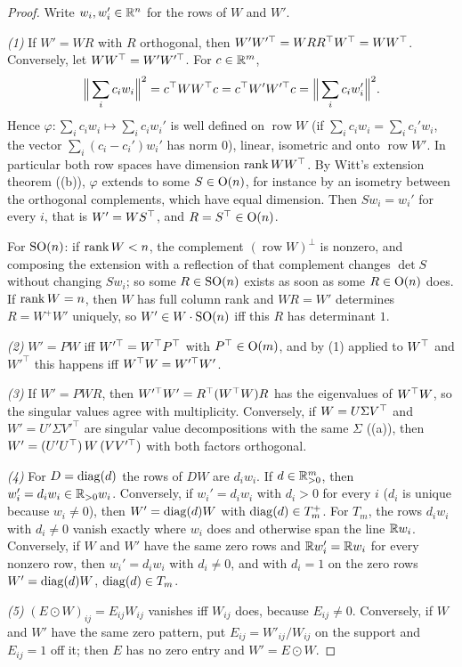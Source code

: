\begin{proof}
Write $w_i,w_i'\in\mathbb{R}^n$ for the rows of $W$ and $W'$.

\emph{(1)} If $W'=WR$ with $R$ orthogonal, then $W'W'^{\top}=WRR^{\top} W^{\top}=WW^{\top}$. Conversely, let $WW^{\top}=W'W'^{\top}$. For
$c\in\mathbb{R}^m$,
\begin{equation*}
  \Big\lVert\sum_ic_iw_i\Big\rVert^2=c^{\top} WW^{\top} c=c^{\top} W'W'^{\top}c=\Big\lVert\sum_ic_iw_i'\Big\rVert^2 .
\end{equation*}
Hence $\varphi:\sum_ic_iw_i\mapsto\sum_ic_iw_i'$ is well defined on $\operatorname{row}W$ (if $\sum_ic_iw_i=\sum_ic_i'w_i$, the
vector $\sum_i(c_i-c_i')w_i'$ has norm $0$), linear, isometric and onto $\operatorname{row}W'$. In particular both row spaces
have dimension $\operatorname{rank} WW^{\top}$. By Witt's extension theorem ((b)), $\varphi$ extends to some $S\in\mathrm{O}(n)$, for
instance by an isometry between the orthogonal complements, which have equal dimension. Then $Sw_i=w_i'$ for every $i$,
that is $W'=WS^{\top}$, and $R=S^{\top}\in\mathrm{O}(n)$.

For $\mathrm{SO}(n)$: if $\operatorname{rank} W<n$, the complement $(\operatorname{row}W)^\perp$ is nonzero, and composing the extension with a
reflection of that complement changes $\det S$ without changing $Sw_i$; so some $R\in\mathrm{SO}(n)$ exists as soon as some
$R\in\mathrm{O}(n)$ does. If $\operatorname{rank} W=n$, then $W$ has full column rank and $WR=W'$ determines $R=W^+W'$ uniquely, so
$W'\in W\cdot\mathrm{SO}(n)$ iff this $R$ has determinant $1$.

\emph{(2)} $W'=PW$ iff $W'^{\top}=W^{\top} P^{\top}$ with $P^{\top}\in\mathrm{O}(m)$, and by (1) applied to $W^{\top}$ and $W'^{\top}$ this happens
iff $W^{\top} W=W'^{\top}W'$.

\emph{(3)} If $W'=PWR$, then $W'^{\top}W'=R^{\top}(W^{\top} W)R$ has the eigenvalues of $W^{\top} W$, so the singular values agree with
multiplicity. Conversely, if $W=U\Sigma V^{\top}$ and $W'=U'\Sigma V'^{\top}$ are singular value decompositions with the same
$\Sigma$ ((a)), then $W'=(U'U^{\top})\,W\,(VV'^{\top})$ with both factors orthogonal.

\emph{(4)} For $D=\operatorname{diag}(d)$ the rows of $DW$ are $d_iw_i$. If $d\in\mathbb{R}^m_{>0}$, then $w_i'=d_iw_i\in\mathbb{R}_{>0}w_i$. Conversely,
if $w_i'=d_iw_i$ with $d_i>0$ for every $i$ ($d_i$ is unique because $w_i\ne0$), then $W'=\operatorname{diag}(d)W$ with
$\operatorname{diag}(d)\in T_m^+$. For $T_m$, the rows $d_iw_i$ with $d_i\ne0$ vanish exactly where $w_i$ does and otherwise span the line
$\mathbb{R} w_i$. Conversely, if $W$ and $W'$ have the same zero rows and $\mathbb{R} w_i'=\mathbb{R} w_i$ for every nonzero row, then $w_i'=d_iw_i$
with $d_i\ne0$, and with $d_i=1$ on the zero rows $W'=\operatorname{diag}(d)W$, $\operatorname{diag}(d)\in T_m$.

\emph{(5)} $(E\odot W)_{ij}=E_{ij}W_{ij}$ vanishes iff $W_{ij}$ does, because $E_{ij}\ne0$. Conversely, if $W$ and $W'$
have the same zero pattern, put $E_{ij}=W'_{ij}/W_{ij}$ on the support and $E_{ij}=1$ off it; then $E$ has no zero entry
and $W'=E\odot W$.
\end{proof}

